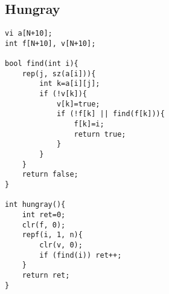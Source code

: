 \subsection{Hungray}
\begin{lstlisting}
vi a[N+10];
int f[N+10], v[N+10];

bool find(int i){
	rep(j, sz(a[i])){
		int k=a[i][j];
		if (!v[k]){
			v[k]=true;
			if (!f[k] || find(f[k])){
				f[k]=i;
				return true;
			}
		}
	}
	return false;
}

int hungray(){
	int ret=0;
	clr(f, 0);
	repf(i, 1, n){
		clr(v, 0);
		if (find(i)) ret++;
	}
	return ret;
}
\end{lstlisting}
